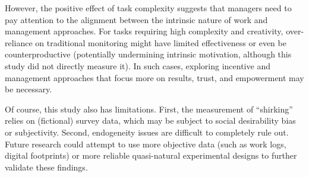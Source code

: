 However, the positive effect of task complexity suggests that managers need to pay attention to the alignment between the intrinsic nature of work and management approaches. For tasks requiring high complexity and creativity, over-reliance on traditional monitoring might have limited effectiveness or even be counterproductive (potentially undermining intrinsic motivation, although this study did not directly measure it). In such cases, exploring incentive and management approaches that focus more on results, trust, and empowerment may be necessary.

Of course, this study also has limitations. First, the measurement of \enquote{shirking} relies on (fictional) survey data, which may be subject to social desirability bias or subjectivity. Second, endogeneity issues are difficult to completely rule out. Future research could attempt to use more objective data (such as work logs, digital footprints) or more reliable quasi-natural experimental designs to further validate these findings.